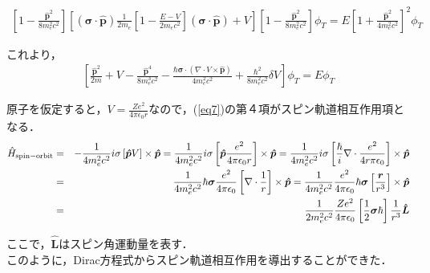 \documentclass[10pt]{ujarticle}
\begin{document}
\begin{eqnarray}
\left[ 1- \frac{\bm{\hat{p}}^2}{8m_e^2 c^2} \right] \left[(\bm{\sigma} \cdot \bm{\hat{p}} ) \frac{1}{2m_e} \left[ 1- \frac{E-V}{2m_e c^2} \right] (\bm{\sigma} \cdot \bm{\hat{p}})+V \right] \left[ 1- \frac{\bm{\hat{p}}^2}{8m_e^2 c^2} \right] \phi_T = E \left[ 1+ \frac{\bm{\hat{p}}^2}{4m_e^2 c^2} \right] ^2 \phi_T
\end{eqnarray}

これより，
\begin{eqnarray}
  \label{eq7}
  \left[ \frac{\bm{\hat{p}}^2}{2m}+V -\frac{\bm{\hat{p}}^4}{8m_e^3 c^2} - \frac{\hbar \bm{\sigma} \cdot(\nabla \cdot V \times \bm{\hat{p}})}{4m_e^2 c^2} + \frac{\hbar^2}{8m_e^2 c^2} \delta V \right] \phi_T = E\phi_T
\end{eqnarray}

原子を仮定すると，$V=\frac{Ze^2}{4\pi \epsilon_0 r}$なので，(\ref{eq7})の第４項がスピン軌道相互作用項となる．
\begin{eqnarray}
  \hat{H}_{\rm{spin-orbit}} &=& -\frac{1}{4m_e^2 c^2} i\sigma \left[\bm{\hat{p}} V\right] \times \bm{\hat{p}} = \frac{1}{4m_e^2 c^2} i\sigma \left[\bm{\hat{p}} \frac{e^2}{4\pi \epsilon_0 r}\right] \times \bm{\hat{p}} = \frac{1}{4m_e^2 c^2} i\sigma \left[ \frac{\hbar}{i} \nabla \cdot \frac{e^2}{4r\pi \epsilon_0} \right] \times \bm{\hat{p}} \\
  &=& \frac{1}{4 m_e^2 c^2}\hbar \bm{\sigma} \frac{e^2}{4\pi \epsilon_0} \left[ \nabla \cdot \frac{1}{r} \right] \times \bm{\hat{p}} = \frac{1}{4m_e^2 c^2} \frac{e^2}{4\pi \epsilon_0} \hbar \bm{\sigma} \left[ \frac{\bm{r}}{r^3} \right] \times \bm{\hat{p}} \\
  &=& \frac{1}{2m_e^2 c^2} \frac{Ze^2}{4\pi \epsilon_0} \left[ \frac{1}{2} \bm{\sigma} \hbar \right] \frac{1}{r^3} \bm{\hat{L}}
\end{eqnarray}

ここで，$\bm{\hat{L}}$はスピン角運動量を表す．\\
このように，Dirac方程式からスピン軌道相互作用を導出することができた．







%
%
\end{document}
